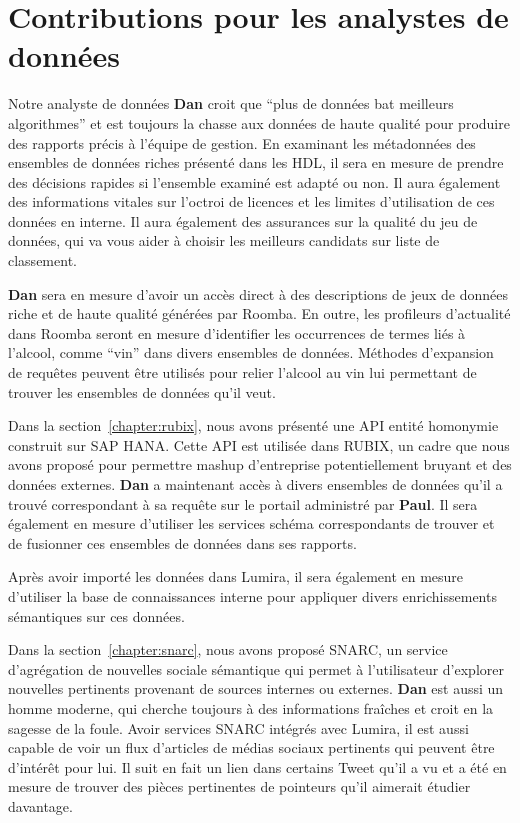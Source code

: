 \documentclass[a4paper,11pt,twoside]{ThesisStyle}
\begin{document}
\section{Contributions pour les analystes de données}

Notre analyste de données \textbf{Dan} croit que ``plus de données bat meilleurs algorithmes'' et est toujours la chasse aux données de haute qualité pour produire des rapports précis à l'équipe de gestion. En examinant les métadonnées des ensembles de données riches présenté dans les HDL, il sera en mesure de prendre des décisions rapides si l'ensemble examiné est adapté ou non. Il aura également des informations vitales sur l'octroi de licences et les limites d'utilisation de ces données en interne. Il aura également des assurances sur la qualité du jeu de données, qui va vous aider à choisir les meilleurs candidats sur liste de classement.

\textbf {Dan} sera en mesure d'avoir un accès direct à des descriptions de jeux de données riche et de haute qualité générées par Roomba. En outre, les profileurs d'actualité dans Roomba seront en mesure d'identifier les occurrences de termes liés à l'alcool, comme ``vin'' dans divers ensembles de données. Méthodes d'expansion de requêtes peuvent être utilisés pour relier l'alcool au vin lui permettant de trouver les ensembles de données qu'il veut.

Dans la section~\ref{chapter:rubix}, nous avons présenté une API entité homonymie construit sur SAP HANA. Cette API est utilisée dans RUBIX, un cadre que nous avons proposé pour permettre mashup d'entreprise potentiellement bruyant et des données externes.
\textbf{Dan} a maintenant accès à divers ensembles de données qu'il a trouvé correspondant à sa requête sur le portail administré par \textbf{Paul}. Il sera également en mesure d'utiliser les services schéma correspondants de trouver et de fusionner ces ensembles de données dans ses rapports.

Après avoir importé les données dans Lumira, il sera également en mesure d'utiliser la base de connaissances interne pour appliquer divers enrichissements sémantiques sur ces données.

Dans la section~\ref{chapter:snarc}, nous avons proposé SNARC, un service d'agrégation de nouvelles sociale sémantique qui permet à l'utilisateur d'explorer nouvelles pertinents provenant de sources internes ou externes. \textbf{ Dan} est aussi un homme moderne, qui cherche toujours à des informations fraîches et croit en la sagesse de la foule. Avoir services SNARC intégrés avec Lumira, il est aussi capable de voir un flux d'articles de médias sociaux pertinents qui peuvent être d'intérêt pour lui. Il suit en fait un lien dans certains Tweet qu'il a vu et a été en mesure de trouver des pièces pertinentes de pointeurs qu'il aimerait étudier davantage.
\end{document}
